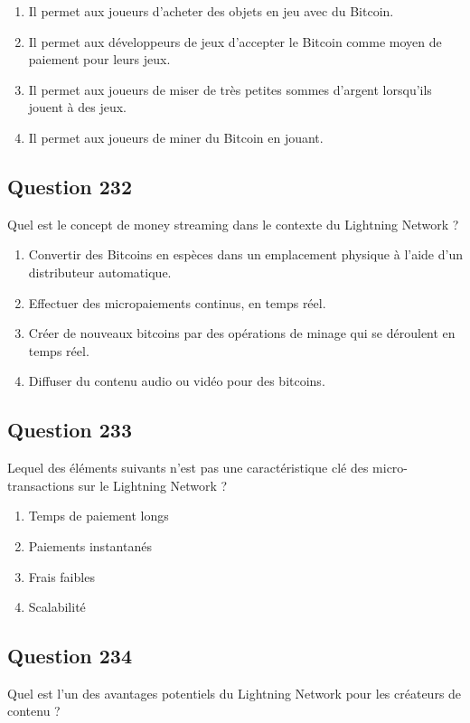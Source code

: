 \documentclass[12pt,a4paper]{article}
\begin{document}
\begin{enumerate}[label=\Alph*., leftmargin=*]
\item Il permet aux joueurs d'acheter des objets en jeu avec du Bitcoin.
\item Il permet aux développeurs de jeux d'accepter le Bitcoin comme moyen de paiement pour leurs jeux.
\item Il permet aux joueurs de miser de très petites sommes d'argent lorsqu'ils jouent à des jeux.
\item Il permet aux joueurs de miner du Bitcoin en jouant.
\end{enumerate}

\bigskip


\subsection*{Question 232}
Quel est le concept de money streaming dans le contexte du Lightning Network ?

\begin{enumerate}[label=\Alph*., leftmargin=*]
\item Convertir des Bitcoins en espèces dans un emplacement physique à l'aide d'un distributeur automatique.
\item Effectuer des micropaiements continus, en temps réel.
\item Créer de nouveaux bitcoins par des opérations de minage qui se déroulent en temps réel.
\item Diffuser du contenu audio ou vidéo pour des bitcoins.
\end{enumerate}

\bigskip


\subsection*{Question 233}
Lequel des éléments suivants n'est pas une caractéristique clé des micro-transactions sur le Lightning Network ?

\begin{enumerate}[label=\Alph*., leftmargin=*]
\item Temps de paiement longs
\item Paiements instantanés
\item Frais faibles
\item Scalabilité
\end{enumerate}

\bigskip


\subsection*{Question 234}
Quel est l'un des avantages potentiels du Lightning Network pour les créateurs de contenu ?
\end{document}
